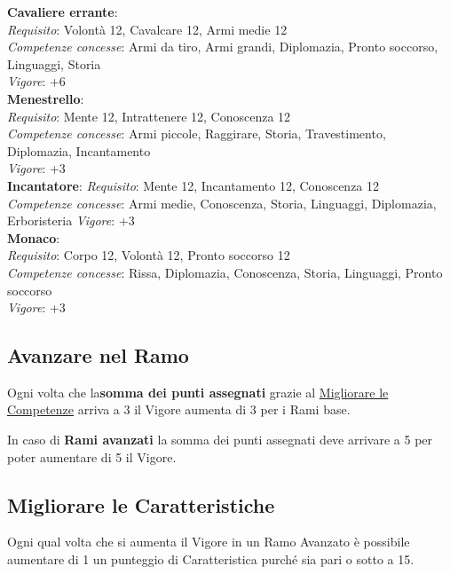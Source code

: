 \documentclass[12pt,a4paper,twoside,openany]{book}
\begin{document}
\begin{multicols}{2}
\textbf{Cavaliere errante}:\\
\textit{Requisito}: Volontà 12, Cavalcare 12, Armi medie 12\\
\textit{Competenze concesse}: Armi da tiro, Armi grandi, Diplomazia, Pronto soccorso, Linguaggi, Storia\\
\textit{Vigore}: +6\\

\textbf{Menestrello}:\\
\textit{Requisito}: Mente 12, Intrattenere 12, Conoscenza 12\\
\textit{Competenze concesse}: Armi piccole, Raggirare, Storia, Travestimento, Diplomazia, Incantamento\\
\textit{Vigore}: +3\\

\textbf{Incantatore}:
\textit{Requisito}: Mente 12, Incantamento 12, Conoscenza 12\\
\textit{Competenze concesse}: Armi medie, Conoscenza, Storia, Linguaggi, Diplomazia, Erboristeria 
\textit{Vigore}: +3\\

\textbf{Monaco}:\\
\textit{Requisito}: Corpo 12, Volontà 12, Pronto soccorso 12\\
\textit{Competenze concesse}: Rissa, Diplomazia, Conoscenza, Storia, Linguaggi, Pronto soccorso\\
\textit{Vigore}: +3\\


\subsection{Avanzare nel Ramo}

Ogni volta che la\textbf{somma dei punti assegnati} grazie al \hyperlink{Migliorare le Competenze}{Migliorare le Competenze} arriva a 3 il Vigore aumenta di 3 per i Rami base.

In caso di \textbf{Rami avanzati} la somma dei punti assegnati deve arrivare a 5 per poter aumentare di 5 il Vigore.

\subsection{Migliorare le Caratteristiche}

Ogni qual volta che si aumenta il Vigore in un Ramo Avanzato è possibile aumentare di 1 un punteggio di Caratteristica purché sia pari o sotto a 15.


\end{multicols}
\end{document}
